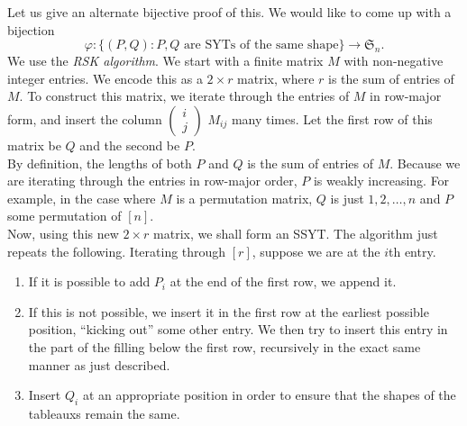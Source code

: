 	Let us give an alternate bijective proof of this.
	We would like to come up with a bijection 
	\[ \varphi : \{(P,Q) : P,Q \text{ are SYTs of the same shape}\} \to \mathfrak{S}_n. \]
	We use the \emph{RSK algorithm}. We start with a finite matrix $M$ with non-negative integer entries. We encode this as a $2 \times r$ matrix, where $r$ is the sum of entries of $M$. To construct this matrix, we iterate through the entries of $M$ in row-major form, and insert the column $\begin{pmatrix} i \\ j \end{pmatrix}$ $M_{ij}$ many times. Let the first row of this matrix be $Q$ and the second be $P$.\\
	By definition, the lengths of both $P$ and $Q$ is the sum of entries of $M$. Because we are iterating through the entries in row-major order, $P$ is weakly increasing. For example, in the case where $M$ is a permutation matrix, $Q$ is just $1,2,\ldots,n$ and $P$ some permutation of $[n]$.\\
	Now, using this new $2 \times r$ matrix, we shall form an SSYT. The algorithm just repeats the following. Iterating through $[r]$, suppose we are at the $i$th entry.
	\begin{enumerate}
		\item If it is possible to add $P_i$ at the end of the first row, we append it.
		\item If this is not possible, we insert it in the first row at the earliest possible position, ``kicking out'' some other entry. We then try to insert this entry in the part of the filling below the first row, recursively in the exact same manner as just described.
		\item Insert $Q_i$ at an appropriate position in order to ensure that the shapes of the tableauxs remain the same.
	\end{enumerate}




